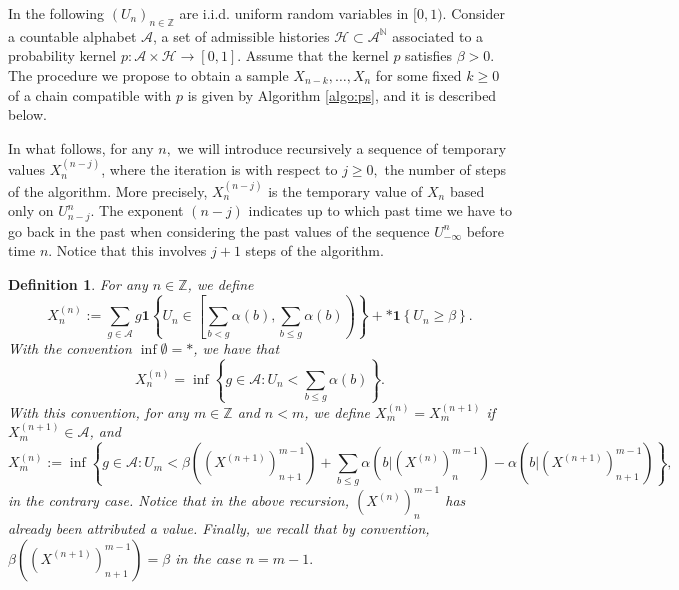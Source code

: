 \documentclass[a4paper]{article}
\newtheorem{definition}{Definition}%
\newcommand{\Z}{\mathbb{Z}}
\newcommand{\N}{\mathbb{N}}
\renewcommand{\H}{\mathcal{H}}
\newcommand{\A}{\mathcal{A}}
\newcommand{\mydef}{:=}
\begin{document}
In the following $(U_n)_{n\in \Z}$ are i.i.d. uniform random variables in $[0,1)$.
Consider a countable alphabet $\A$, a set of admissible histories $\H \subset \A^{\N}$ associated to a probability kernel $p:\A\times \H \to [0,1]$. Assume that the kernel $p$ satisfies $\beta>0$.
The procedure  we propose to obtain a sample $X_{n-k},\ldots, X_n$ for some fixed $ k\geq0$ of a chain compatible with $p$ is given by Algorithm \ref{algo:ps}, and it is described below.

In what follows, for any $ n, $ we will introduce recursively a sequence of temporary values $X^{{(n-j)}}_{n}$, where the iteration is with respect to $j\geq 0, $ the number of steps of the algorithm. More precisely, $X^{{(n-j)}}_{n}$ is the temporary value of $X_n$ based only on $U_{n-j}^{n}$. The exponent $ (n-j)$ indicates up to which past time we have to go back in the past when considering the past values of the sequence $U_{-\infty}^n $ before time $n.$ Notice that this involves $j+1$ steps of the algorithm.

\begin{definition}  \label{def:algo1}
For any $n\in \Z$, we define
$$
X_n^{(n)}\mydef \sum_{g\in \A}g\mathbf{1}\left\{U_n \in \left[\sum_{b<g}\alpha(b),\sum_{b\leq g}\alpha(b)\right)\right\}+*\mathbf{1}\left\{U_n\geq \beta\right\}.
$$
With the convention $\inf\emptyset=*$, we have that
$$
X_{n}^{(n)} = \inf\left\{g\in \A:U_{n} < \sum_{b\leq g}\alpha(b)\right\}.
$$
With this convention, for any $m\in \Z$ and $n<m$, we define $X_{m}^{(n)}=X_{m}^{(n+1)}$ if $X_{m}^{(n+1)} \in \A$, and
$$
X_{m}^{(n)} := \inf\left\{g\in \A :U_{m} < \beta((X^{(n+1)})^{m-1}_{n+1})+\sum_{b\leq g}\alpha(b|(X^{(n)})^{m-1}_{n})-\alpha(b|(X^{(n+1)})^{m-1}_{n+1})\right\},
$$
in the contrary case. Notice that in the above recursion, $(X^{(n)})^{m-1}_{n}$ has already been attributed a value. Finally, we recall that by convention, $ \beta((X^{(n+1)})^{m-1}_{n+1}) = \beta $ in the case $ n= m-1.$ 

\end{definition}
\end{document}
